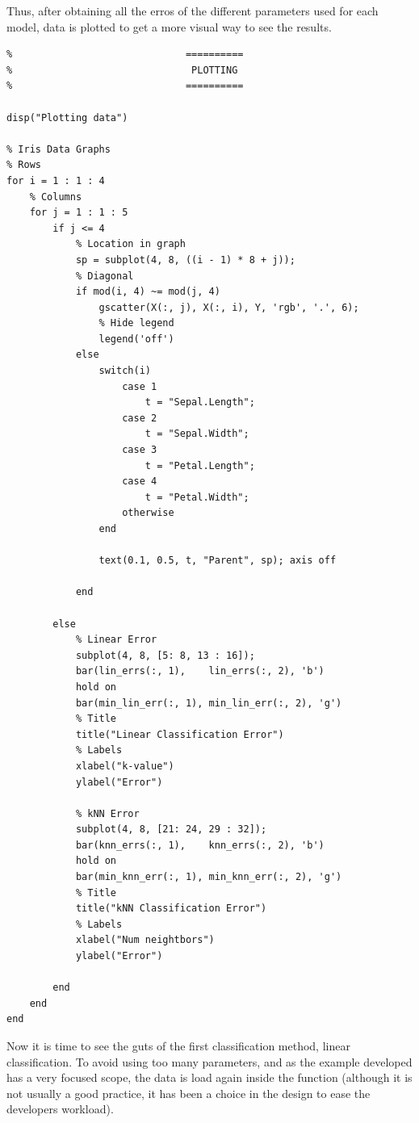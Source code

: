 \documentclass[11pt]{article}
\begin{document}
Thus, after obtaining all the erros of the different parameters used for each
model, data is plotted to get a more visual way to see the results.

\begin{verbatim}
%                              ==========
%                               PLOTTING
%                              ==========

disp("Plotting data")

% Iris Data Graphs
% Rows
for i = 1 : 1 : 4
    % Columns
    for j = 1 : 1 : 5
        if j <= 4
            % Location in graph
            sp = subplot(4, 8, ((i - 1) * 8 + j));
            % Diagonal             
            if mod(i, 4) ~= mod(j, 4)
                gscatter(X(:, j), X(:, i), Y, 'rgb', '.', 6);
                % Hide legend
                legend('off')
            else
                switch(i)
                    case 1
                        t = "Sepal.Length";
                    case 2
                        t = "Sepal.Width";
                    case 3
                        t = "Petal.Length";
                    case 4
                        t = "Petal.Width";
                    otherwise
                end

                text(0.1, 0.5, t, "Parent", sp); axis off

            end   
            
        else
            % Linear Error
            subplot(4, 8, [5: 8, 13 : 16]);
            bar(lin_errs(:, 1),    lin_errs(:, 2), 'b')
            hold on
            bar(min_lin_err(:, 1), min_lin_err(:, 2), 'g')
            % Title
            title("Linear Classification Error")
            % Labels
            xlabel("k-value")
            ylabel("Error")
            
            % kNN Error
            subplot(4, 8, [21: 24, 29 : 32]);
            bar(knn_errs(:, 1),    knn_errs(:, 2), 'b')
            hold on
            bar(min_knn_err(:, 1), min_knn_err(:, 2), 'g')
            % Title
            title("kNN Classification Error")
            % Labels
            xlabel("Num neightbors")
            ylabel("Error")
            
        end 
    end
end
\end{verbatim}

Now it is time to see the guts of the first classification method, linear
classification. To avoid using too many parameters, and as the example developed
has a very focused scope, the data is load again inside the function (although
it is not usually a good practice, it has been a choice in the design to ease
the developers workload).
\end{document}
